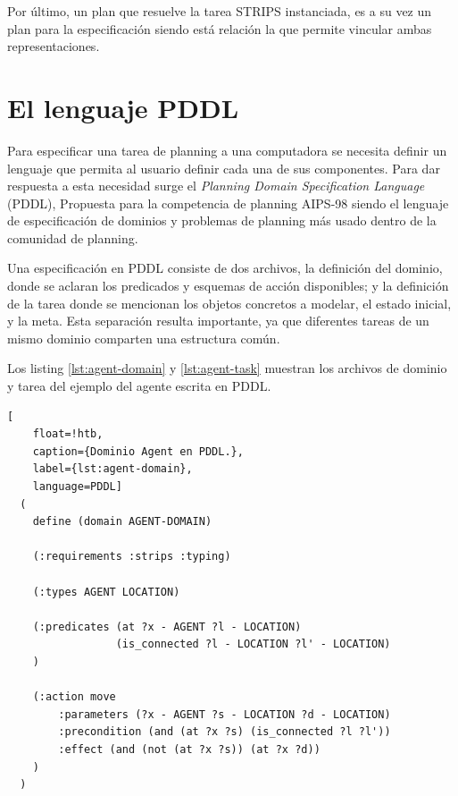 Por último, un plan que resuelve la tarea STRIPS instanciada, es a su vez un plan para la especificación siendo está relación la que permite vincular ambas representaciones.

\section{El lenguaje PDDL}

Para especificar una tarea de planning a una computadora se necesita definir un
lenguaje que permita al usuario definir cada una de sus componentes. Para dar
respuesta a esta necesidad surge el \emph{Planning Domain Specification
Language} (PDDL), Propuesta para la competencia de planning
AIPS-98 \citep{McDermott1998} siendo el lenguaje de especificación de dominios y problemas de planning más usado dentro
de la comunidad de planning.

Una especificación en PDDL consiste de dos archivos, la definición del dominio,
donde se aclaran los predicados y esquemas de acción disponibles; y la
definición de la tarea donde se mencionan los objetos concretos a modelar, el
estado inicial, y la meta. Esta separación resulta importante, ya que diferentes
tareas de un mismo dominio comparten una estructura común.

Los listing \ref{lst:agent-domain} y \ref{lst:agent-task} muestran los archivos
de dominio y tarea del ejemplo del agente escrita en PDDL.

\begin{lstlisting}[
    float=!htb,
    caption={Dominio Agent en PDDL.},
    label={lst:agent-domain},
    language=PDDL]
  (
    define (domain AGENT-DOMAIN)

    (:requirements :strips :typing)

    (:types AGENT LOCATION)

    (:predicates (at ?x - AGENT ?l - LOCATION)
                 (is_connected ?l - LOCATION ?l' - LOCATION)
    )

    (:action move
        :parameters (?x - AGENT ?s - LOCATION ?d - LOCATION)
        :precondition (and (at ?x ?s) (is_connected ?l ?l'))
        :effect (and (not (at ?x ?s)) (at ?x ?d))
    )
  )
\end{lstlisting}

